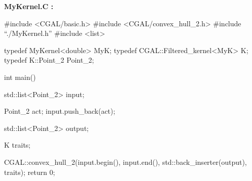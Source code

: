 {\bf MyKernel.C :}

\begin{ccExampleCode}
#include <CGAL/basic.h>
#include <CGAL/convex_hull_2.h>
#include ``./MyKernel.h''
#include <list>

typedef MyKernel<double>           MyK;
typedef CGAL::Filtered_kernel<MyK> K;
typedef K::Point_2                 Point_2;

int main()
{
  std::list<Point_2> input;
  
  Point_2 act;
  input.push_back(act);

  std::list<Point_2> output;

  K  traits;

  CGAL::convex_hull_2(input.begin(), input.end(),
                      std::back_inserter(output), traits);		        
  return 0;
}
\end{ccExampleCode}

\ccHtmlLinksOn


